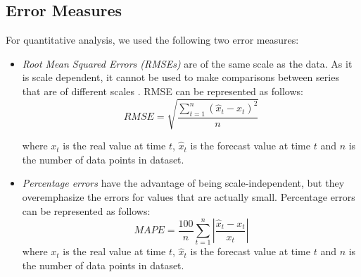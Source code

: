 \subsection{Error Measures}
For quantitative analysis, we used the following two error measures:

\begin{itemize}
\item \textit{Root Mean Squared Errors (RMSEs)} are of the same scale as the data. As it is scale dependent, it cannot be used to make comparisons between series that are of different scales \cite{Forecasting_OTexts}. RMSE can be represented as follows:
$$RMSE=\sqrt{\frac{\sum_{t=1}^{n}(\hat{x}_{t}-x_{t})^{2}}{n}}$$

where $x_{t}$ is the real value at time $t$,  $\hat{x}_{t}$ is the forecast value at time $t$ and $n$ is the number of data points in dataset.

\item \textit{Percentage errors} have the advantage of being scale-independent, but they overemphasize the errors for values that are actually small. Percentage errors can be represented as follows:
$$MAPE=\frac{100}{n}\sum_{t=1}^{n}\left | \frac{\hat{x}_{t}-x_{t}}{x_{t}} \right |$$
where $x_{t}$ is the real value at time $t$,  $\hat{x}_{t}$ is the forecast value at time $t$ and $n$ is the number of data points in dataset.

\end{itemize}